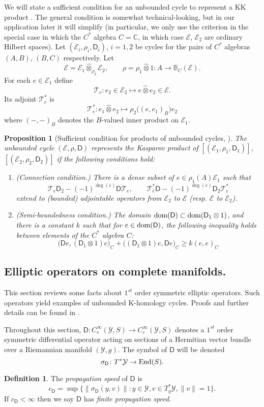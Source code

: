\documentclass[11pt,reqno]{amsart}
\newtheorem{proposition}[theorem]{Proposition}
\theoremstyle{definition}
\newtheorem{definition}[theorem]{Definition}
\theoremstyle{remark}
\newcommand{\wh}[1]{\widehat{#1}}
\newcommand{\st}[1]{\mathsf{#1}}
\def\T{\ensuremath{\mathcal{T}}}
\def\E{\ensuremath{\mathcal{E}}}
\def\Y{\ensuremath{\mathcal{Y}}}
\def\bC{\ensuremath{\mathbb{C}}}
\def\bB{\ensuremath{\mathbb{B}}}
\def\End{\ensuremath{\textnormal{End}}}
\def\dom{\ensuremath{\textnormal{dom}}}
\begin{document}
We will state a sufficient condition for an unbounded cycle to represent a KK product \cite{KucerovskyUnbounded}.  The general condition is somewhat technical-looking, but in our application later it will simplify (in particular, we only use the criterion in the special case in which the $C^\ast$ algebra $C=\bC$, in which case $\E$, $\E_2$ are ordinary Hilbert spaces).  Let $(\E_i,\rho_i,\st{D}_i)$, $i=1,2$ be cycles for the pairs of $C^\ast$ algebras $(A,B)$, $(B,C)$ respectively.  Let
\[ \E=\E_1 \wh{\otimes}_{\rho_2} \E_2, \qquad \rho=\rho_1\wh{\otimes} 1 \colon A \rightarrow \bB_C(\E).\]
For each $e \in \E_1$ define
\[ \T_e \colon e_2 \in \E_2 \mapsto e \wh{\otimes} e_2 \in \E.\]
Its adjoint $\T_e^\ast$ is
\[ \T_e^\ast \colon e_1\wh{\otimes} e_2 \mapsto \rho_2\big((e,e_1)_B\big)e_2 \]
where $(-,-)_B$ denotes the $B$-valued inner product on $\E_1$.
\begin{proposition}[Sufficient condition for products of unbounded cycles, \cite{KucerovskyUnbounded}]
\label{prop:SuffCond}
The unbounded cycle $(\E,\rho,\st{D})$ represents the Kasparov product of $[(\E_1,\rho_1,\st{D}_1)]$, $[(\E_2,\rho_2,\st{D}_2)]$ if the following conditions hold:
\begin{enumerate}
\item \emph{(Connection condition.)} There is a dense subset of $e \in \rho_1(A)\E_1$ such that
\[ \T_e \st{D}_2-(-1)^{\deg(e)}\st{D} \T_e, \qquad \T_e^\ast\st{D}-(-1)^{\deg(e)} \st{D}_2\T_e^\ast \]
extend to (bounded) adjointable operators from $\E_2$ to $\E$ (resp. $\E$ to $\E_2$).
\item \emph{(Semi-boundedness condition.)} The domain $\dom(\st{D}) \subset \dom(\st{D}_1\otimes 1)$, and there is a constant $k$ such that for $e \in \dom(\st{D})$, the following inequality holds between elements of the $C^\ast$ algebra $C$:
\[ \big(\st{D}e,(\st{D}_1\otimes 1)e\big)_C+\big((\st{D}_1\otimes 1)e,\st{D}e\big)_C \ge k(e,e)_C\]
\end{enumerate}  
\end{proposition}

\subsection{Elliptic operators on complete manifolds.}
This section reviews some facts about $1^{st}$ order symmetric elliptic operators.  Such operators yield examples of unbounded K-homology cycles.  Proofs and further details can be found in \cite[Chapter 10]{HigsonRoe}.

Throughout this section, $\st{D}\colon C^\infty_c(\Y,S) \rightarrow C^\infty_c(\Y,S)$ denotes a $1^{st}$ order symmetric differential operator acting on sections of a Hermitian vector bundle over a Riemannian manifold $(\Y,g)$.  The symbol of $\st{D}$ will be denoted
\[ \sigma_{\st{D}} \colon T^\ast \Y \rightarrow \End(S).\] 
\begin{definition}
The \emph{propagation speed} of $\st{D}$ is
\[ c_{\st{D}}=\sup \{\|\sigma_{\st{D}}(y,v)\|:y \in \Y,v \in T_y^\ast \Y,\|v\|=1\}.\]
If $c_{\st{D}}<\infty$ then we say $\st{D}$ has \emph{finite propagation speed}.
\end{definition}
\end{document}
